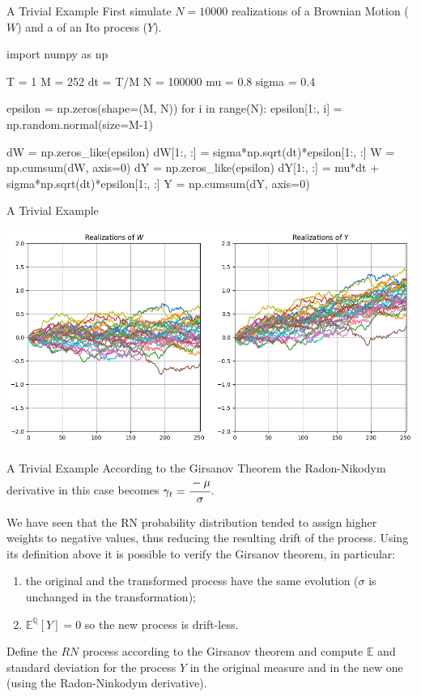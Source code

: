 \documentclass{beamer}
\begin{document}
\begin{frame}[fragile]{A Trivial Example}
First simulate $N=10000$ realizations of a Brownian Motion ($W$) and a of an Ito process ($Y$).
\begin{codebox}
\begin{ipython}[linewidth=0.6\linewidth]
import numpy as np

T = 1
M = 252
dt = T/M
N = 100000
mu = 0.8
sigma = 0.4

epsilon = np.zeros(shape=(M, N))
for i in range(N):
    epsilon[1:, i] = np.random.normal(size=M-1)

dW = np.zeros_like(epsilon)
dW[1:, :] = sigma*np.sqrt(dt)*epsilon[1:, :]
W = np.cumsum(dW, axis=0)
dY = np.zeros_like(epsilon)
dY[1:, :] = mu*dt + sigma*np.sqrt(dt)*epsilon[1:, :]
Y = np.cumsum(dY, axis=0)
\end{ipython}
\end{codebox}
\end{frame}

\begin{frame}{A Trivial Example}
	\begin{center}
		\includegraphics[width=0.9\linewidth]{images/ito_for_girsanov}
	\end{center}
\end{frame}

\begin{frame}{A Trivial Example}
According to the Girsanov Theorem the Radon-Nikodym derivative in this case becomes $\gamma_t = \cfrac{-\mu}{\sigma}$.

We have seen that the RN probability distribution tended to assign higher weights to negative values, thus reducing the resulting drift of the process.
Using its definition above it is possible to verify the Girsanov theorem, in particular:
\begin{enumerate}
\item the original and the transformed process have the same evolution ($\sigma$ is unchanged in the transformation);
\item $\mathbb{E}^{\mathbb{Q}}[Y] = 0$ so the new process is drift-less.
\end{enumerate}  

Define the $RN$ process according to the Girsanov theorem and compute $\mathbb{E}$ and standard deviation for the process $Y$ in the original measure and in the new one (using the Radon-Ninkodym derivative).
\end{frame}
\end{document}
